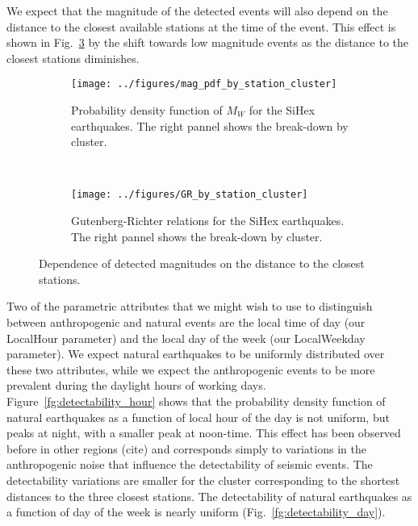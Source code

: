 We expect that the magnitude of the detected events will also depend on the
distance to the closest available stations at the time of the event. This
effect is shown in Fig.~\ref{fg:mag_by_cluster} by the shift towards low
magnitude events as the distance to the closest stations diminishes.

\begin{figure}
\centering
\begin{subfigure}[t]{\textwidth}
	\centering
	\texttt{[image: ../figures/mag\_pdf\_by\_station\_cluster]}
	\caption{Probability density function of $M_W$ for the SiHex
	earthquakes. The right pannel shows the break-down by cluster.
	} 
	\label{fg:hist_mag_by_cluster}
\end{subfigure}
~
\begin{subfigure}[t]{\textwidth}
	\centering
	\texttt{[image: ../figures/GR\_by\_station\_cluster]}
	\caption{Gutenberg-Richter relations for the SiHex earthquakes. The
	right pannel shows the break-down by cluster.}
	\label{fg:GR_by_cluster}
\end{subfigure}
\caption{Dependence of detected magnitudes on the distance to the closest
stations.}
\label{fg:mag_by_cluster}
\end{figure}

Two of the parametric attributes that we might wish to use to distinguish
between anthropogenic and natural events are the local time of day (our
LocalHour parameter) and the local day of the week (our LocalWeekday
parameter). We expect natural earthquakes to be uniformly distributed over
these two attributes, while we expect the anthropogenic events to be more
prevalent during the daylight hours of working days.
Figure~\ref{fg:detectability_hour} shows that the probability density function
of natural earthquakes as a function of local hour of the day is not uniform,
but peaks at night, with a smaller peak at noon-time.  This effect has been
observed before in other regions (cite) and corresponds simply to variations in
the anthropogenic noise that influence the detectability of seismic events. The
detectability variations are smaller for the cluster corresponding to the
shortest distances to the three closest stations. The detectability of natural
earthquakes as a function of day of the week is nearly uniform
(Fig.~\ref{fg:detectability_day}).


